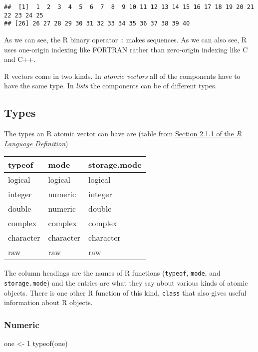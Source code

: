 \documentclass[
]{article}
\newenvironment{Shaded}{\begin{snugshade}}{\end{snugshade}}
\newcommand{\DecValTok}[1]{\textcolor[rgb]{0.00,0.00,0.81}{#1}}
\newcommand{\FunctionTok}[1]{\textcolor[rgb]{0.00,0.00,0.00}{#1}}
\newcommand{\NormalTok}[1]{#1}
\newcommand{\OtherTok}[1]{\textcolor[rgb]{0.56,0.35,0.01}{#1}}
\begin{document}
\begin{verbatim}
##  [1]  1  2  3  4  5  6  7  8  9 10 11 12 13 14 15 16 17 18 19 20 21 22 23 24 25
## [26] 26 27 28 29 30 31 32 33 34 35 36 37 38 39 40
\end{verbatim}

As we can see, the R binary operator \texttt{:} makes sequences. As we
can also see, R uses one-origin indexing like FORTRAN rather than
zero-origin indexing like C and C++.

R vectors come in two kinds. In \emph{atomic vectors} all of the
components have to have the same type. In \emph{lists} the components
can be of different types.

\hypertarget{types}{%
\subsection{Types}\label{types}}

The types an R atomic vector can have are (table from
\href{https://cloud.r-project.org/doc/manuals/r-release/R-lang.html\#Vector-objects}{Section
2.1.1 of the \emph{R Language Definition}})

\begin{longtable}[]{@{}lll@{}}
\toprule
typeof & mode & storage.mode \\
\midrule
\endhead
logical & logical & logical \\
integer & numeric & integer \\
double & numeric & double \\
complex & complex & complex \\
character & character & character \\
raw & raw & raw \\
\bottomrule
\end{longtable}

The column headings are the names of R functions (\texttt{typeof},
\texttt{mode}, and \texttt{storage.mode}) and the entries are what they
say about various kinds of atomic objects. There is one other R function
of this kind, \texttt{class} that also gives useful information about R
objects.

\hypertarget{numeric}{%
\subsubsection{Numeric}\label{numeric}}

\begin{Shaded}
\begin{Highlighting}[]
\NormalTok{one }\OtherTok{\textless{}{-}} \DecValTok{1}
\FunctionTok{typeof}\NormalTok{(one)}
\end{Highlighting}
\end{Shaded}
\end{document}
